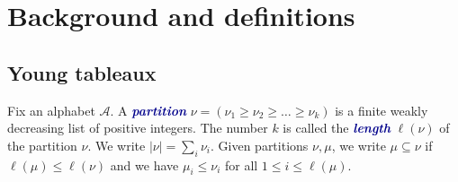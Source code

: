 \documentclass[12 pt]{amsart}
\newcommand{\newword}[1]{\textcolor{darkblue}{\textbf{\emph{#1}}}}
\newcommand{\Z}{\mathbb{Z}}
\newcommand{\cA}{\mathcal{A}}
\theoremstyle{remark}
\newtheorem{definition}[thm]{Definition}
\numberwithin{equation}{section}
\begin{document}



\section{Background and definitions}\label{sec:background}

\subsection{Young tableaux}
Fix an alphabet $\cA$.
A \newword{partition} $\nu = (\nu_1 \geq \nu_2 \geq \dots \geq \nu_k)$ is a finite weakly decreasing list of positive integers. The number $k$ is called the \newword{length} $\ell(\nu)$ of the partition $\nu$. We write $|\nu| = \sum_i \nu_i$. Given partitions $\nu, \mu$, we write $\mu \subseteq \nu$ if $\ell(\mu) \leq \ell(\nu)$ and we have $\mu_i \leq \nu_i$ for all $1 \leq i \leq \ell(\mu)$.
\end{document}
